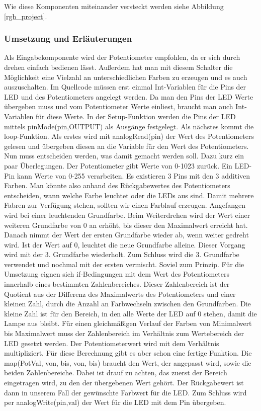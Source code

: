 Wie diese Komponenten miteinander versteckt werden siehe Abbildung \ref{rgb_project}.

\subsubsection{Umsetzung und Erläuterungen}
Als Eingabekomponente wird der Potentiometer empfohlen, da er sich durch drehen einfach bedienen lässt. Außerdem hat man mit diesem Schalter die Möglichkeit eine Vielzahl an unterschiedlichen Farben zu erzeugen und es auch auszuschalten. 
Im Quellcode müssen erst einmal Int-Variablen für die Pins der LED und des Potentiometers angelegt werden. Da man den Pins der LED Werte übergeben muss und vom Potentiometer Werte einliest, braucht man auch Int-Variablen für diese Werte.
In der Setup-Funktion werden die Pins der LED mittels pinMode(pin,OUTPUT) als Ausgänge festgelegt.
Als nächstes kommt die loop-Funktion. Als erstes wird mit analogRead(pin) der Wert des Potentiometers gelesen und übergeben diesen an die Variable für den Wert des Potentiometers.
Nun muss entscheiden werden, was damit gemacht werden soll. Dazu kurz ein paar Überlegungen. Der Potentiometer gibt Werte von 0-1023 zurück. Ein LED-Pin kann Werte von 0-255 verarbeiten. Es existieren 3 Pins mit den 3 additiven Farben. Man könnte also anhand des Rückgabewertes des Potentiometers entscheiden, wann welche Farbe leuchtet oder die LEDs aus sind. Damit mehrere Fabren zur Verfügung stehen, sollten wir einen Farblauf erzeugen. Angefangen wird bei einer leuchtenden Grundfarbe. Beim Weiterdrehen wird der Wert einer weiteren Grundfarbe von 0 an erhöht, bis dieser den Maximalwert erreicht hat. Danach nimmt der Wert der ersten Grundfarbe wieder ab, wenn weiter gedreht wird. Ist der Wert auf 0, leuchtet die neue Grundfarbe alleine. Dieser Vorgang wird mit der 3. Grundfarbe wiederholt. Zum Schluss wird die 3. Grundfarbe verwendet und nochmal mit der ersten vermischt.
Soviel zum Prinzip. Für die Umsetzung eignen sich if-Bedingungen mit dem Wert des Potentiometers innerhalb eines bestimmten Zahlenbereiches. Dieser Zahlenbereich ist der Quotient aus der Differenz des Maximalwerts des Potentiometers und einer kleinen Zahl, durch die Anzahl an Farbwechseln zwischen den Grundfarben. Die kleine Zahl ist für den Bereich, in den alle Werte der LED auf 0 stehen, damit die Lampe aus bleibt. Für einen gleichmäßigen Verlauf der Farben von Minimalwert bis Maximalwert muss der Zahlenbereich im Verhältnis zum Wertebereich der LED gesetzt werden. Der Potentiometerwert wird mit dem Verhältnis multipliziert. Für diese Berechnung gibt es aber schon eine fertige Funktion. Die map(PotVal, von, bis, von, bis) braucht den Wert, der angepasst wird, sowie die beiden Zahlenbereiche. Dabei ist drauf zu achten, das zuerst der Bereich eingetragen wird, zu den der übergebenen Wert gehört. Der Rückgabewert ist dann in unserem Fall der gewünschte Farbwert für die LED.
Zum Schluss wird per analogWrite(pin,val) der Wert für die LED mit dem Pin übergeben. 


